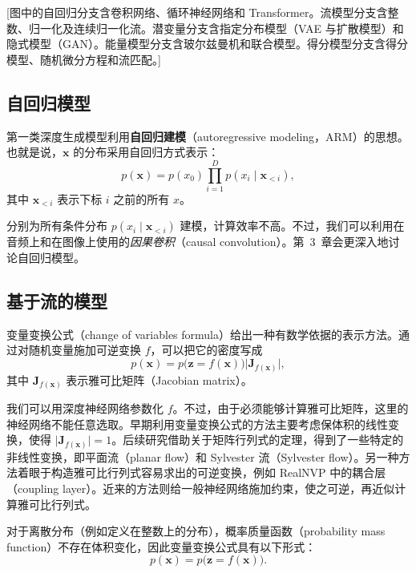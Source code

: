 [图中的自回归分支含卷积网络、循环神经网络和 Transformer。流模型分支含整数、归一化及连续归一化流。潜变量分支含指定分布模型（VAE 与扩散模型）和隐式模型（GAN）。能量模型分支含玻尔兹曼机和联合模型。得分模型分支含得分模型、随机微分方程和流匹配。]
\FloatBarrier

\subsection{自回归模型}
第一类深度生成模型利用\textbf{自回归建模}（autoregressive modeling，ARM）的思想。也就是说，$\mathbf{x}$ 的分布采用自回归方式表示：
\begin{equation}
p(\mathbf{x})=p(x_0)\prod_{i=1}^{D}p(x_i\mid\mathbf{x}_{<i}),
\tag{1.1}\label{eq:01-01}
\end{equation}
其中 $\mathbf{x}_{<i}$ 表示下标 $i$ 之前的所有 $x$。

分别为所有条件分布 $p(x_i\mid\mathbf{x}_{<i})$ 建模，计算效率不高。不过，我们可以利用在音频上和在图像上使用的\emph{因果卷积}（causal convolution）。第~3~章会更深入地讨论自回归模型。

\subsection{基于流的模型}
变量变换公式（change of variables formula）给出一种有数学依据的表示方法。通过对随机变量施加可逆变换 $f$，可以把它的密度写成
\begin{equation}
p(\mathbf{x})=p\bigl(\mathbf{z}=f(\mathbf{x})\bigr)\lvert\mathbf{J}_{f(\mathbf{x})}\rvert,
\tag{1.2}\label{eq:01-02}
\end{equation}
其中 $\mathbf{J}_{f(\mathbf{x})}$ 表示雅可比矩阵（Jacobian matrix）。

我们可以用深度神经网络参数化 $f$。不过，由于必须能够计算雅可比矩阵，这里的神经网络不能任意选取。早期利用变量变换公式的方法主要考虑保体积的线性变换，使得 $\lvert\mathbf{J}_{f(\mathbf{x})}\rvert=1$。后续研究借助关于矩阵行列式的定理，得到了一些特定的非线性变换，即平面流（planar flow）和 Sylvester 流（Sylvester flow）。另一种方法着眼于构造雅可比行列式容易求出的可逆变换，例如 RealNVP 中的耦合层（coupling layer）。近来的方法则给一般神经网络施加约束，使之可逆，再近似计算雅可比行列式。

对于离散分布（例如定义在整数上的分布），概率质量函数（probability mass function）不存在体积变化，因此变量变换公式具有以下形式：
\begin{equation}
p(\mathbf{x})=p\bigl(\mathbf{z}=f(\mathbf{x})\bigr).
\tag{1.3}\label{eq:01-03}
\end{equation}

